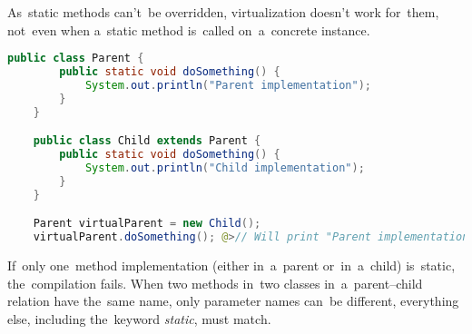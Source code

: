 \warning As~static methods can't~be overridden, virtualization doesn't work for~them, not~even when a~static method is~called on~a~concrete instance.

\example
\begin{lstlisting}[language=Java]
    public class Parent {
        public static void doSomething() {
            System.out.println("Parent implementation");
        }
    }

    public class Child extends Parent {
        public static void doSomething() {
            System.out.println("Child implementation");
        }
    }

    Parent virtualParent = new Child();
    virtualParent.doSomething(); @>// Will print "Parent implementation"
\end{lstlisting}

\note If~only one~method implementation (either in~a~parent or~in~a~child) is~static, the~compilation fails.
When two methods in~two classes in~a~parent--child relation have the~same name, only parameter names can~be different, everything else, including the~keyword \textit{static}, must match.
